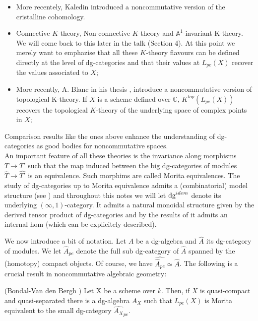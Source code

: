 \begin{refsection}
\begin{itemize}
\item More recentely, Kaledin \cite{kaledin} introduced a noncommutative version of the cristalline cohomology.

\item Connective $K$-theory, Non-connective $K$-theory and $\mathbb{A}^1$-invariant K-theory. We will come back to this later in the talk (Section 4). At this point we merely want to emphazise that all these $K$-theory flavours can be defined directly at the level of dg-categories and that their values at $L_{pe}(X)$ recover the values associated to $X$;

\item More recently, A. Blanc in his thesis \cite{Anthony-thesis}, introduce a noncommutative version of topological K-theory. If $X$ is a scheme defined over $\mathbb{C}$, $K^{top}(L_{pe}(X))$ recovers the topological $K$-theory of the underlying space of complex points in $X$;
\end{itemize}

Comparison results like the ones above enhance the understanding of dg-categories as good bodies for noncommutative spaces.\\

An important feature of all these theories is the invariance along morphisms $T\to T'$ such that the map induced between the big dg-categories of modules $\widehat{T}\to \widehat{T'}$ is an equivalence. Such morphims are called Morita equivalences. The study of dg-categories up to Morita equivalence admits a (combinatorial) model structure (see \cite{tabuada-quillen}) and throughout this notes we will let $\mathrm{dg}^{idem}$ denote its underlying $(\infty,1)$-category. It admits a natural monoidal structure given by the derived tensor product of dg-categories and by the results of \cite{Toen-homotopytheorydgcatsandderivedmoritaequivalences} it admits an internal-hom (which can be explicitely described).


We now introduce a bit of notation. Let $A$ be a dg-algebra and $\widehat{A}$ its dg-category of modules. We let $\widehat{A}_{pe}$ denote the full sub dg-category of $\widehat{A}$ spanned by the (homotopy) compact objects. Of course, we have $\widehat{\widehat{A}_{pe}}\simeq \widehat{A}$.  The following is a crucial result in noncommutative algebraic geometry:

\begin{thm}(Bondal-Van den Bergh \cite{bondal-vandenbergh})
Let X be a scheme over $k$. Then, if $X$ is quasi-compact and quasi-separated there is a dg-algebra $A_X$ such that $L_{pe}(X)$ is Morita equivalent to the small dg-category $\widehat{A_X}_{pe}$.
\end{thm}


\end{refsection}
